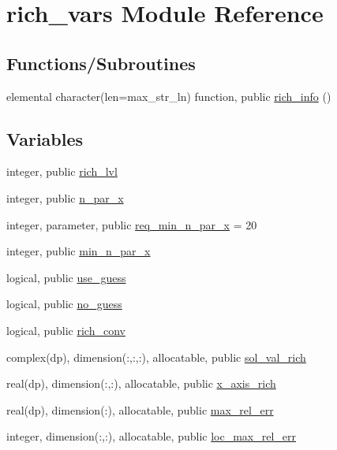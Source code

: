 \hypertarget{namespacerich__vars}{}\section{rich\+\_\+vars Module Reference}
\label{namespacerich__vars}
\subsection*{Functions/\+Subroutines}
\begin{DoxyCompactItemize}
\item 
elemental character(len=max\+\_\+str\+\_\+ln) function, public \hyperlink{namespacerich__vars_a4f54d3fc0ac510fc073220794ee4fa37}{rich\+\_\+info} ()
\end{DoxyCompactItemize}
\subsection*{Variables}
\begin{DoxyCompactItemize}
\item 
integer, public \hyperlink{namespacerich__vars_a1b7734ba9ce6cc153b22387e638093c0}{rich\+\_\+lvl}
\item 
integer, public \hyperlink{namespacerich__vars_a7a32b8d53450cf925042cd5ddc7e23e6}{n\+\_\+par\+\_\+x}
\item 
integer, parameter, public \hyperlink{namespacerich__vars_a94e61b5125377ab3e984334998f5ebae}{req\+\_\+min\+\_\+n\+\_\+par\+\_\+x} = 20
\item 
integer, public \hyperlink{namespacerich__vars_a07841cccca6e6ee59aeb4e0661558eda}{min\+\_\+n\+\_\+par\+\_\+x}
\item 
logical, public \hyperlink{namespacerich__vars_aedc7171560db899c515d1610d99582c9}{use\+\_\+guess}
\item 
logical, public \hyperlink{namespacerich__vars_a167fe55b5d9c1a4566729da683466947}{no\+\_\+guess}
\item 
logical, public \hyperlink{namespacerich__vars_adf63efd509bbcda4f77fd7e88c766081}{rich\+\_\+conv}
\item 
complex(dp), dimension(\+:,\+:,\+:), allocatable, public \hyperlink{namespacerich__vars_ae1d3c7deb4c8becd036a63367fca5e20}{sol\+\_\+val\+\_\+rich}
\item 
real(dp), dimension(\+:,\+:), allocatable, public \hyperlink{namespacerich__vars_a7f584d9b84f3e3e230b45ce4b8e0e9b1}{x\+\_\+axis\+\_\+rich}
\item 
real(dp), dimension(\+:), allocatable, public \hyperlink{namespacerich__vars_afac4d06d60829484cfb7d4964964945b}{max\+\_\+rel\+\_\+err}
\item 
integer, dimension(\+:,\+:), allocatable, public \hyperlink{namespacerich__vars_af3df7361e33058bc83fe43a803173d89}{loc\+\_\+max\+\_\+rel\+\_\+err}
\end{DoxyCompactItemize}


